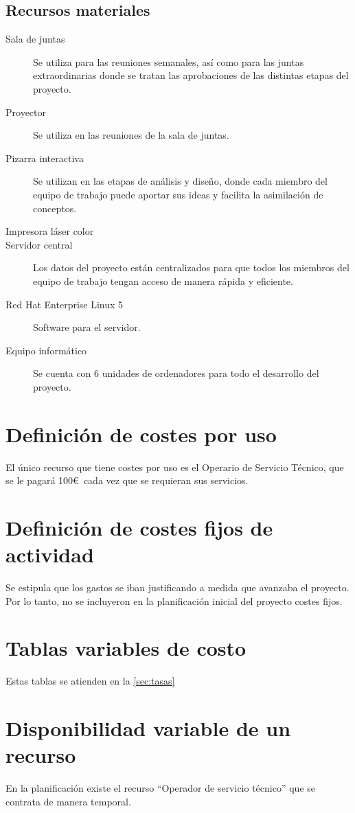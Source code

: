 \documentclass[11pt,a4paper,spanish,twoside]{book}
\begin{document}
\subsection{Recursos materiales}
\begin{description}
\item[Sala de juntas] Se utiliza para las reuniones semanales, así como para 
las juntas extraordinarias donde se tratan las aprobaciones de las distintas 
etapas del proyecto.
\item[Proyector] Se utiliza en las reuniones de la sala de juntas.
\item[Pizarra interactiva] Se utilizan en las etapas de análisis y diseño, 
donde cada miembro del equipo de trabajo puede aportar sus ideas y facilita la 
asimilación de conceptos.
\item[Impresora láser color]
\item[Servidor central] Los datos del proyecto están centralizados para que 
todos los miembros del equipo de trabajo tengan acceso de manera rápida y 
eficiente.
\item[Red Hat Enterprise Linux 5] Software para el servidor.
\item[Equipo informático] Se cuenta con 6 unidades de ordenadores para todo el 
desarrollo del proyecto.  
\end{description}

\section{Definición de costes por uso}
El único recurso que tiene costes por uso es el Operario de Servicio Técnico,
que se le pagará 100\euro\ cada vez que se requieran sus servicios.

\section{Definición de costes fijos de actividad}
Se estipula que los gastos se iban justificando a medida que avanzaba el
proyecto. Por lo tanto, no se incluyeron en la planificación inicial del
proyecto costes fijos.

\section{Tablas variables de costo}
Estas tablas se atienden en la \autoref{sec:tasas}

\section{Disponibilidad variable de un recurso}
En la planificación existe el recurso ``Operador de servicio técnico'' que se
contrata de manera temporal.
\end{document}
